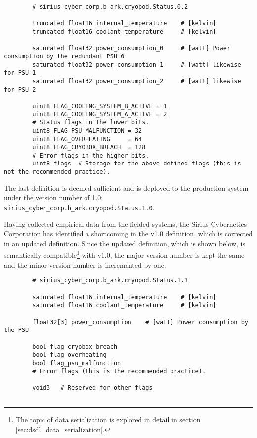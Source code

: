 \begin{remark}[breakable]
    \begin{verbatim}
        # sirius_cyber_corp.b_ark.cryopod.Status.0.2

        truncated float16 internal_temperature    # [kelvin]
        truncated float16 coolant_temperature     # [kelvin]

        saturated float32 power_consumption_0     # [watt] Power consumption by the redundant PSU 0
        saturated float32 power_consumption_1     # [watt] likewise for PSU 1
        saturated float32 power_consumption_2     # [watt] likewise for PSU 2

        uint8 FLAG_COOLING_SYSTEM_B_ACTIVE = 1
        uint8 FLAG_COOLING_SYSTEM_A_ACTIVE = 2
        # Status flags in the lower bits.
        uint8 FLAG_PSU_MALFUNCTION = 32
        uint8 FLAG_OVERHEATING     = 64
        uint8 FLAG_CRYOBOX_BREACH  = 128
        # Error flags in the higher bits.
        uint8 flags  # Storage for the above defined flags (this is not the recommended practice).
    \end{verbatim}

    The last definition is deemed sufficient and is deployed to the production system
    under the version number of 1.0: \verb|sirius_cyber_corp.b_ark.cryopod.Status.1.0|.

    Having collected empirical data from the fielded systems, the Sirius Cybernetics Corporation has
    identified a shortcoming in the v1.0 definition, which is corrected in an updated definition.
    Since the updated definition, which is shown below, is semantically compatible\footnote{%
        The topic of data serialization is explored in detail in section \ref{sec:dsdl_data_serialization}.
    } with v1.0, the major version number is kept the same and the minor version number is incremented by one:

    \begin{verbatim}
        # sirius_cyber_corp.b_ark.cryopod.Status.1.1

        saturated float16 internal_temperature    # [kelvin]
        saturated float16 coolant_temperature     # [kelvin]

        float32[3] power_consumption    # [watt] Power consumption by the PSU

        bool flag_cryobox_breach
        bool flag_overheating
        bool flag_psu_malfunction
        # Error flags (this is the recommended practice).

        void3   # Reserved for other flags


\end{verbatim}
\end{remark}
